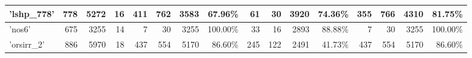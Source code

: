 \begin{table}[]
{\begin{tabular}{|l|r|r|r|r|r|r|r|r|r|r|r|r|r|r|r|}
\hline
'lshp\_778'                   & 778                                                     & 5272                                                & 16                                                       & 411                     & 762                     & 3583                                                                          & 67.96\%                                                                          & 61                      & 30                      & 3920                                                                           & 74.36\%                                                                          & 355                     & 766                     & 4310                                                                           & 81.75\%                                                                           \\ 
\hline
'nos6'                        & 675                                                     & 3255                                                & 14                                                       & 7                       & 30                      & 3255                                                                          & 100.00\%                                                                         & 33                      & 16                      & 2893                                                                           & 88.88\%                                                                          & 7                       & 30                      & 3255                                                                           & 100.00\%                                                                          \\ 
\hline
'orsirr\_2'                   & 886                                                     & 5970                                                & 18                                                       & 437                     & 554                     & 5170                                                                          & 86.60\%                                                                          & 245                     & 122                     & 2491                                                                           & 41.73\%                                                                          & 437                     & 554                     & 5170                                                                           & 86.60\%                                                                           \\ 

\end{tabular}}
\end{table}
